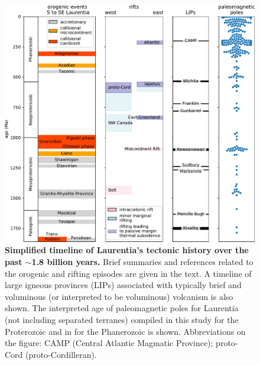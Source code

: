 \documentclass[11pt,letterpaper]{article}
\begin{document}
\begin{figure}
\centering
\includegraphics[width=\textwidth]{../Figures/Tectonic_history.pdf}
\caption{\small{\textbf{Simplified timeline of Laurentia's tectonic history over the past $\sim$1.8 billion years.} Brief summaries and references related to the orogenic and rifting episodes are given in the text. A timeline of large igneous provinces (LIPs) associated with typically brief and voluminous (or interpreted to be voluminous) volcanism is also shown. The interpreted age of paleomagnetic poles for Laurentia (not including separated terranes) compiled in this study for the Proterozoic and in \cite{Torsvik2012a} for the Phanerozoic is shown. Abbreviations on the figure: CAMP (Central Atlantic Magmatic Province); proto-Cord (proto-Cordilleran).}}
\label{fig:tectonic_history}
\end{figure}
\end{document}
